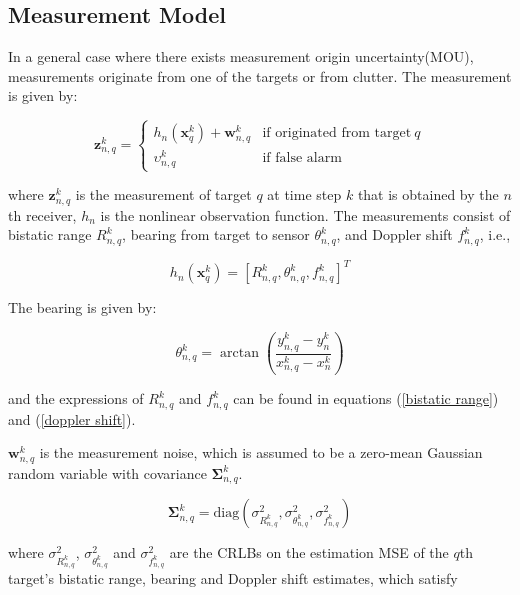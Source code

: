 \documentclass[12pt,journal,draftclsnofoot,onecolumn]{IEEEtran}
\begin{document}
\subsection{Measurement Model}
In a general case where there exists measurement origin uncertainty(MOU), measurements originate from one of the targets or from clutter. The measurement is given by:

\begin{equation}
    \mathbf{z}_{n,q}^k=\begin{cases} h_{n}(\mathbf{x}_q^k)+\mathbf{w}_{n,q}^k & \mbox{if originated from target}\ q\\ \upsilon_{n,q}^k & \mbox{if false alarm}
    	\end{cases}
    \label{measurement function}
\end{equation}

where $\mathbf{z}_{n,q}^k$ is the measurement of target $q$ at time step $k$ that is obtained by the $n$th receiver, $h_{n}$ is the nonlinear observation function. The measurements consist of bistatic range $R_{n,q}^k$, bearing from target to sensor $\theta_{n,q}^k$, and Doppler shift $f_{n,q}^k$, i.e.,

\begin{equation}
	h_{n}(\mathbf{x}_q^k)=[R_{n,q}^k, \theta_{n,q}^k, f_{n,q}^k]^T
\end{equation}

The bearing is given by:

\begin{equation}
\theta_{n,q}^k=\arctan {(\frac{{y_{n,q}^k - y_n^k}}{{x_{n,q}^k - x_n^k}})} 
\end{equation}

and the expressions of $R_{n,q}^k$ and  $f_{n,q}^k$ can be found in equations (\ref{bistatic range}) and (\ref{doppler shift}).

$\mathbf{w}_{n,q}^k$ is the measurement noise, which is assumed to be a zero-mean Gaussian random variable with covariance $\mathbf{\Sigma}_{n,q}^k$. 

\begin{equation} 
\boldsymbol {\Sigma}_{n,q}^k = \text{diag}\left({\sigma _{R_{n,q}^k}^2,\sigma _{\theta _{n,q}^k}^2,\sigma _{f_{n,q}^k}^2} \right)
\label{measurement noise covariance}
\end{equation}

where $\sigma _{R_{n,q}^k}^2$, $\sigma _{\theta _{n,q}^k}^2$ and $\sigma _{f_{n,q}^k}^2$ are the CRLBs on the estimation MSE of the $q$th target's bistatic range, bearing and Doppler shift estimates, which satisfy
\end{document}
